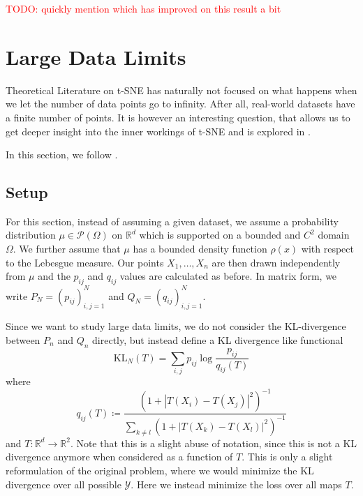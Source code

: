 \textcolor{red}{TODO: quickly mention \cite{Arora18} which has improved on this result a bit}

\section{Large Data Limits}\label{sec:large_data}
Theoretical Literature on t-SNE has naturally not focused on what happens when we let the number of data points go to infinity. After all, real-world datasets have a finite number of points. It is however an interesting question, that allows us to get deeper insight into the inner workings of t-SNE and is explored in \cite{murray2024largedatalimitsscaling}. 

In this section, we follow \cite{murray2024largedatalimitsscaling}. 

\subsection*{Setup}
For this section, instead of assuming a given dataset, we assume a probability distribution $\mu \in \mathcal{P}(\Omega)$ on $\mathbb{R}^d$ which is supported on a bounded and $C^2$ domain $\Omega$. 
We further assume that $\mu$ has a bounded density function $\rho(x)$ with respect to the Lebesgue measure. 
Our points $X_1, \dots, X_n$ are then drawn independently from $\mu$ and the $p_{ij}$ and $q_{ij}$ values are calculated as before. 
In matrix form, we write $P_N = (p_{ij})_{i,j=1}^N$ and $Q_N = (q_{ij})_{i,j=1}^N$. 

Since we want to study large data limits, we do not consider the KL-divergence between $P_n$ and $Q_n$ directly, but instead define a KL divergence like functional
\begin{equation}
    \text{KL}_N (T) = \sum_{i,j} p_{ij} \log \frac{p_{ij}}{q_{ij}(T)}
\end{equation}
where 
\begin{equation}
    q_{ij}(T) \coloneq \frac{(1+ |T(X_i) - T(X_j)|^2)^{-1}}{\sum_{k \neq l} (1+ |T(X_k) - T(X_l)|^2)^{-1}}
\end{equation}
and $T: \mathbb{R}^d \to \mathbb{R}^2$. Note that this is a slight abuse of notation, since this is not a KL divergence anymore when considered as a function of $T$.  This is only a slight reformulation of the original problem, where we would minimize the KL divergence over all possible $\mathcal{Y}$. Here we instead minimize the loss over all maps $T$.  


